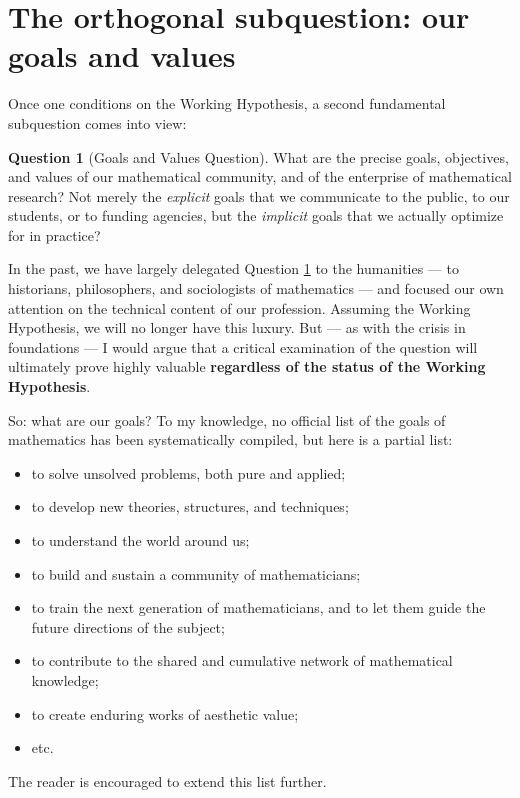 \documentclass[12pt]{amsart}
\theoremstyle{definition}
\newtheorem{question}{Question}[section]
\begin{document}
\section{The orthogonal subquestion: our goals and values}

Once one conditions on the Working Hypothesis, a second fundamental subquestion comes into view:


\begin{question}[Goals and Values Question]\label{gvq}
What are the precise goals, objectives, and values of our mathematical community, and of the enterprise of mathematical research?  Not merely the \emph{explicit} goals that we communicate to the public, to our students, or to funding agencies, but the \emph{implicit} goals that we actually optimize for in practice?
\end{question}

In the past, we have largely delegated Question \ref{gvq} to the humanities --- to historians, philosophers, and sociologists of mathematics --- and focused our own attention on the technical content of our profession.  Assuming the Working Hypothesis, we will no longer have this luxury.  But --- as with the crisis in foundations --- I would argue that a critical examination of the question will ultimately prove highly valuable \textbf{regardless of the status of the Working Hypothesis}.  

So: what are our goals?  To my knowledge, no official list of the goals of mathematics has been systematically compiled, but here is a partial list:

\begin{itemize}
\item to solve unsolved problems, both pure and applied;
\item to develop new theories, structures, and techniques;
\item to understand the world around us;
\item to build and sustain a community of mathematicians;
\item to train the next generation of mathematicians, and to let them guide the future directions of the subject;
\item to contribute to the shared and cumulative network of mathematical knowledge;
\item to create enduring works of aesthetic value;
\item etc.
\end{itemize}

The reader is encouraged to extend this list further.
\end{document}
